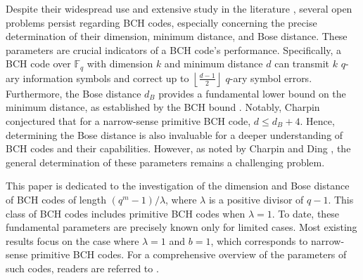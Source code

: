 \documentclass[journal,onecolumn]{IEEEtran}
\begin{document}
Despite their widespread use and extensive study in the literature 
\cite{  CPHTZ2006, DFZ2017, DYFT1997, FTT1986, HS1973, KILS2001, KOLS1999, KTFT1985, KTLS1972, LDL2017, LLDL2017, LRFL2019, RM1991, YH1996, CP1994,WXZ2024,FLD2023,WWL2023,XL2024,DLMQ2023,SLD2023, ZXP2024}, several open problems persist regarding BCH codes, especially concerning the precise determination of their dimension, minimum distance, and Bose distance. These parameters are crucial indicators of a BCH code's performance. Specifically, a BCH code over $\mathbb{F}_q$ with dimension $k$ and minimum distance $d$ can transmit $k$ $q$-ary information symbols and correct up to $\left\lfloor \frac{d-1}{2} \right\rfloor$ $q$-ary symbol errors. Furthermore, the Bose distance $d_B$ provides a fundamental lower bound on the minimum distance, as established by the BCH bound \cite{H1959, BR1960}. Notably, Charpin \cite{CP1994} conjectured that for a narrow-sense primitive BCH code, $d \leq d_B + 4$. Hence,  determining the Bose distance is also invaluable for a deeper understanding of BCH codes and their capabilities. However, as noted  by Charpin \cite{charpin1998open} and Ding \cite{ding2024bch}, the general determination of these parameters remains a challenging problem.



This paper is dedicated to the investigation of the dimension and Bose distance of BCH codes of length $(q^m-1)/\lambda$,    where $\lambda$ is a positive divisor of $q-1$.  This class of   BCH codes includes primitive BCH codes when $\lambda=1$. To date, these fundamental parameters are precisely known only for limited cases. Most existing results  focus on the case where $\lambda = 1$ and $b = 1$, which corresponds to narrow-sense primitive BCH codes. For a comprehensive overview of the parameters of such codes, readers are referred to \cite{zheng2025, liu2017, NLMY2021, GLQ2024,pang2021five,D2015,DDZ2015}.
\end{document}
